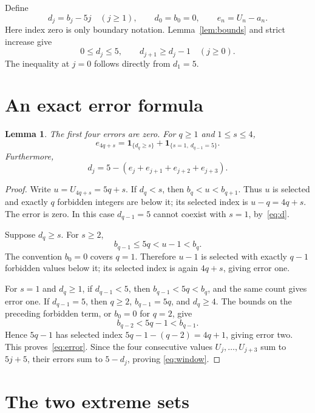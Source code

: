 \documentclass[11pt]{article}
\newtheorem{lemma}[theorem]{Lemma}
\newcommand{\ind}{\mathbf 1}
\begin{document}
Define
\[
 d_j=b_j-5j\quad(j\ge1),\qquad d_0=b_0=0,
 \qquad e_n=U_n-a_n.
\]
Here index zero is only boundary notation. Lemma~\ref{lem:bounds} and strict
increase give
\begin{equation}\label{eq:d}
 0\le d_j\le5,\qquad d_{j+1}\ge d_j-1\quad(j\ge0).
\end{equation}
The inequality at $j=0$ follows directly from $d_1=5$.

\section{An exact error formula}

\begin{lemma}\label{lem:error}
The first four errors are zero. For $q\ge1$ and $1\le s\le4$,
\begin{equation}\label{eq:error}
 e_{4q+s}=\ind_{\{d_q\ge s\}}+
           \ind_{\{s=1,\ d_{q-1}=5\}}.
\end{equation}
Furthermore,
\begin{equation}\label{eq:window}
 d_j=5-(e_j+e_{j+1}+e_{j+2}+e_{j+3}).
\end{equation}
\end{lemma}

\begin{proof}
Write $u=U_{4q+s}=5q+s$. If $d_q<s$, then
$b_q<u<b_{q+1}$. Thus $u$ is selected and exactly $q$ forbidden integers are
below it; its selected index is $u-q=4q+s$. The error is zero. In this case
$d_{q-1}=5$ cannot coexist with $s=1$, by~\eqref{eq:d}.

Suppose $d_q\ge s$. For $s\ge2$,
\[
 b_{q-1}\le5q<u-1<b_q.
\]
The convention $b_0=0$ covers $q=1$. Therefore $u-1$ is selected with exactly
$q-1$ forbidden values below it; its selected index is again $4q+s$, giving
error one.

For $s=1$ and $d_q\ge1$, if $d_{q-1}<5$, then
$b_{q-1}<5q<b_q$, and the same count gives error one. If $d_{q-1}=5$, then
$q\ge2$, $b_{q-1}=5q$, and $d_q\ge4$. The bounds on the preceding forbidden
term, or $b_0=0$ for $q=2$, give
\[
 b_{q-2}<5q-1<b_{q-1}.
\]
Hence $5q-1$ has selected index $5q-1-(q-2)=4q+1$, giving error two.
This proves~\eqref{eq:error}. Since the four consecutive values
$U_j,\ldots,U_{j+3}$ sum to $5j+5$, their errors sum to $5-d_j$, proving
\eqref{eq:window}.
\end{proof}

\section{The two extreme sets}
\end{document}
